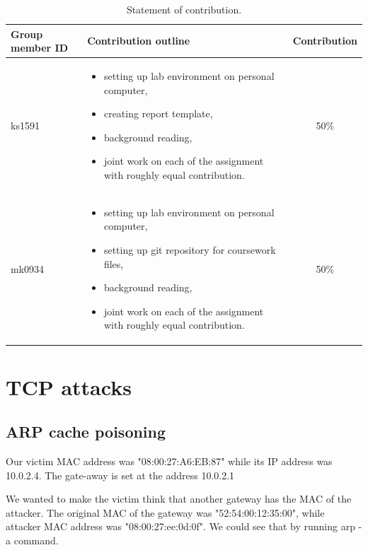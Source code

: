 \documentclass[12pt, a4paper, pdflatex]{article}
\begin{document}
\begin{center}
  \begin{table}[h]
    \begin{tabular}{ l | p{8.5cm} | c }
      Group member ID & Contribution outline & Contribution \\
      \hline
      ks1591 &
      \begin{itemize}
        \item setting up lab environment on personal computer,
        \item creating report template,
        \item background reading,
        \item joint work on each of the assignment with roughly equal contribution.
      \end{itemize}
      & 50\% \\
      mk0934 &
      \begin{itemize}
        \item setting up lab environment on personal computer,
        \item setting up git repository for coursework files,
        \item background reading,
        \item joint work on each of the assignment with roughly equal contribution.
      \end{itemize}
      & 50\% \\
    \end{tabular}
    \caption{Statement of contribution.\label{tab:SoC}}
  \end{table}
\end{center}

\newpage

\section{TCP attacks}

\subsection{ARP cache poisoning}\label{arp}

Our victim MAC address was "08:00:27:A6:EB:87" while its IP address was 10.0.2.4. The gate-away is set at the address 10.0.2.1 

We wanted to make the victim think that another gateway has the MAC of the attacker. The original MAC of the gateway was "52:54:00:12:35:00", while attacker MAC address was "08:00:27:ee:0d:0f". We could see that by running arp -a command.\\
\end{document}
